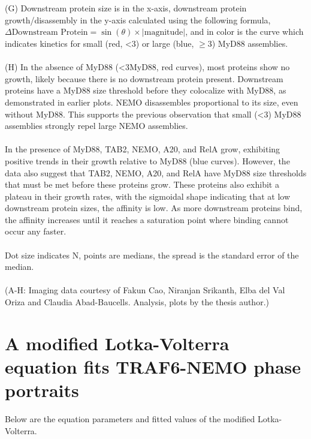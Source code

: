 \begin{centering}
{\\
\\
(G) Downstream protein size is in the x-axis, downstream protein growth/disassembly in the y-axis calculated using the following formula, $\Delta\text{Downstream Protein} = \sin(\theta) \times |\text{magnitude}|$, and in color is the curve which indicates kinetics for small (red, <3\times) or large (blue, $\geq$3\times) MyD88 assemblies.
\\
\\
(H) In the absence of MyD88 (<3\times MyD88, red curves), most proteins show no growth, likely because there is no downstream protein present. Downstream proteins have a MyD88 size threshold before they colocalize with MyD88, as demonstrated in earlier plots. NEMO disassembles proportional to its size, even without MyD88. This supports the previous observation that small (<3\times) MyD88 assemblies strongly repel large NEMO assemblies.
\\
\\
In the presence of MyD88, TAB2, NEMO, A20, and RelA grow, exhibiting positive trends in their growth relative to MyD88 (blue curves). However, the data also suggest that TAB2, NEMO, A20, and RelA have MyD88 size thresholds that must be met before these proteins grow. These proteins also exhibit a plateau in their growth rates, with the sigmoidal shape indicating that at low downstream protein sizes, the affinity is low. As more downstream proteins bind, the affinity increases until it reaches a saturation point where binding cannot occur any faster.
\\
\\
Dot size indicates N, points are medians, the spread is the standard error of the median.
\\
\\
(A-H: Imaging data courtesy of Fakun Cao, Niranjan Srikanth, Elba del Val Oriza and Claudia Abad-Baucells. Analysis, plots by the thesis author.)}
\label{p2:S5}
\end{centering}

\section{A modified Lotka-Volterra equation fits TRAF6-NEMO phase portraits}
Below are the equation parameters and fitted values of the modified Lotka-Volterra.

